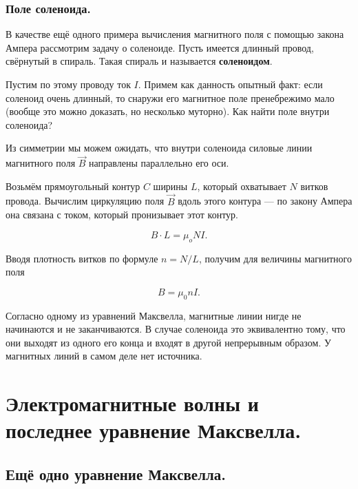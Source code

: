 \documentclass[a4paper,12pt]{article}
\begin{document}
\subsubsection{Поле соленоида. }
\label{sec:solenoid}

В качестве ещё одного примера вычисления магнитного поля с помощью
закона Ампера рассмотрим задачу о соленоиде. Пусть имеется длинный
провод, свёрнутый в спираль. Такая спираль и называется
\textbf{соленоидом}. 

Пустим по этому проводу ток $I$. Примем как данность опытный факт:
если соленоид очень длинный, то снаружи его магнитное поле
пренебрежимо мало (вообще это можно доказать, но несколько
муторно). Как найти поле внутри соленоида? 

Из симметрии мы можем ожидать, что внутри соленоида силовые линии
магнитного поля $\vec{B}$ направлены параллельно его оси. 

Возьмём прямоугольный контур $C$ ширины $L$, который охватывает $N$
витков провода. Вычислим циркуляцию поля $\vec{B}$ вдоль этого
контура --- по закону Ампера она связана с током, который пронизывает
этот контур. 

\begin{equation}
  \label{eq:der_mfield_solenoid}
  B \cdot L = \mu_o N I.
\end{equation}

Вводя плотность витков по формуле $n = N/L$, получим для величины
магнитного поля

\begin{equation}
  \label{eq:mfield_solenoid}
  B = \mu_0 n I.
\end{equation}

Согласно одному из уравнений Максвелла, магнитные линии нигде не
начинаются и не заканчиваются. В случае соленоида это эквивалентно
тому, что они выходят из одного его конца и входят в другой
непрерывным образом. У магнитных линий в самом деле нет источника. 



\section{Электромагнитные волны и последнее уравнение Максвелла. }
\label{sec:em_waves}

\subsection{Ещё одно уравнение Максвелла.}
\label{sec:maxwell_eq_4}
\end{document}
